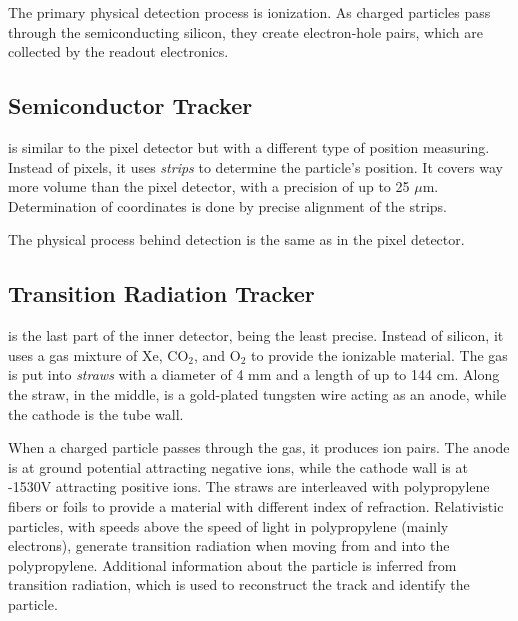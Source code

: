 The primary physical detection process is ionization.
As charged particles pass through the semiconducting silicon, they create electron-hole pairs, which are collected by the readout electronics.

\subsection{Semiconductor Tracker}
\SCT is similar to the pixel detector but with a different type of position measuring.
Instead of pixels, it uses  \emph{strips} to determine the particle's position.
It covers way more volume than the pixel detector,  with a precision of up to 25 $\mu$m.
Determination of coordinates is done by precise alignment of the strips.

The physical process behind detection is the same as in the pixel detector.

\subsection{Transition Radiation Tracker}
\TRT is the last part of the inner detector, being the least precise.
Instead of silicon, it uses a gas mixture of Xe, CO$_2$, and O$_2$ to provide the ionizable material.
The gas is put into \emph{straws} with a diameter of 4 mm and a length of up to 144 cm.
Along the straw, in the middle, is a gold-plated tungsten wire acting as an anode, while the cathode is the tube wall.

When a charged particle passes through the gas, it produces ion pairs.
The anode is at ground potential attracting negative ions, while the cathode wall is at -1530V attracting positive ions.
The straws are interleaved with polypropylene fibers or foils to provide a material with different index of refraction.
Relativistic particles, with speeds above the speed of light in polypropylene (mainly electrons), generate transition radiation when moving from and into the polypropylene. 
Additional information about the particle is inferred from transition radiation, which is used to reconstruct the track and identify the particle. 



